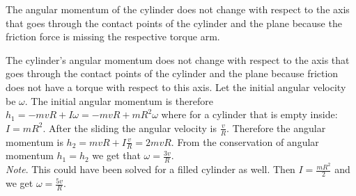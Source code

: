 {\ifEngHint
The angular momentum of the cylinder does not change with respect to the axis that goes through the contact points of the cylinder and the plane because the friction force is missing the respective torque arm.
\fi


\ifEngSolution
The cylinder’s angular momentum does not change with respect to the axis that goes through the contact points of the cylinder and the plane because friction does not have a torque with respect to this axis. Let the initial angular velocity be $\omega$. The initial angular momentum is therefore $h_1=-mvR+I\omega=-mvR+mR^2\omega$ where for a cylinder that is empty inside: $I=mR^2$. After the sliding the angular velocity is $\frac{v}{R}$. Therefore the angular momentum is $h_2=mvR+I\frac{v}{R}=2mvR$. From the conservation of angular momentum $h_1=h_2$ we get that $\omega=\frac{3v}{R}$.\\
\emph{Note}. This could have been solved for a filled cylinder as well. Then $I=\frac{mR^2}{2}$ and we get $\omega = \frac{5v}{R}$.
\fi
}